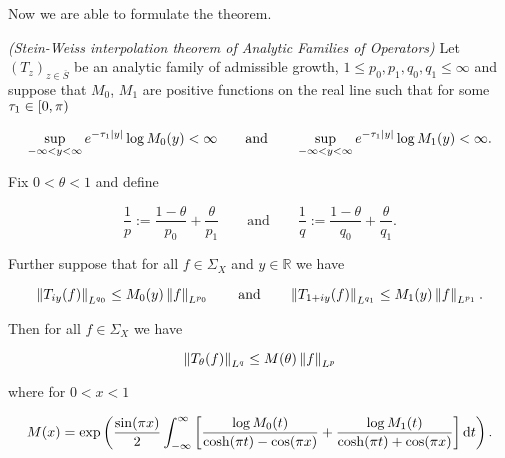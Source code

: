 Now we are able to formulate the theorem.

\vspace{2mm}

\begin{mdframed}
	\begin{theorem}\emph{(Stein-Weiss interpolation theorem of Analytic Families of Operators)}
		Let $( T_z )_{z \in \overline{S}}$ be an analytic family of admissible growth, $1 \leq p_0,p_1,q_0,q_1 \leq \infty$ and suppose that $M_0$, $M_1$ are positive functions on the real line such that for some $\tau_1 \in \intco{0,\pi}$

			\begin{equation}
				\sup_{-\infty < y <\infty} e^{-\tau_1 \abs[0]{ y }} \log M_0(y) < \infty \qquad \text{and} \qquad \sup_{-\infty < y < \infty} e^{-\tau_1 \abs[0]{ y }} \log M_1(y) < \infty.
				\label{eq:growth_conditions}
			\end{equation}

			Fix $0 < \theta < 1$ and define

			\begin{equation}
				\frac{1}{p} := \frac{1 - \theta}{p_0} + \frac{\theta}{p_1} \qquad \text{and} \qquad \frac{1}{q} := \frac{1 - \theta}{q_0} + \frac{\theta}{q_1}.
			\end{equation}

			Further suppose that for all $f \in \Sigma_X$ and $y \in \mathbb{R}$ we have

			\begin{equation}
				\norm[0]{T_{iy}(f)}_{L^{q_0}} \leq M_0(y)\norm[0]{f}_{L^{p_0}} \qquad \text{and} \qquad \norm[0]{T_{1 + iy}(f)}_{L^{q_1}} \leq M_1(y)\norm[0]{f}_{L^{p_1}}.
			\end{equation}

			Then for all $f \in \Sigma_X$ we have

			\begin{equation*}
				\norm[0]{T_\theta(f)}_{L^q} \leq M(\theta)\norm[0]{f}_{L^p}
			\end{equation*}

			\noindent where for $0 < x < 1$

			\begin{equation*}
				M(x) = \exp\del[3]{ \frac{\sin(\pi x)}{2} \int_{-\infty}^\infty \sbr[3]{ \frac{\log M_0(t)}{\cosh(\pi t) - \cos(\pi x)} + \frac{\log M_1(t)}{\cosh(\pi t) + \cos(\pi x)}} \d t }.
			\end{equation*}
	\end{theorem}
\end{mdframed}

